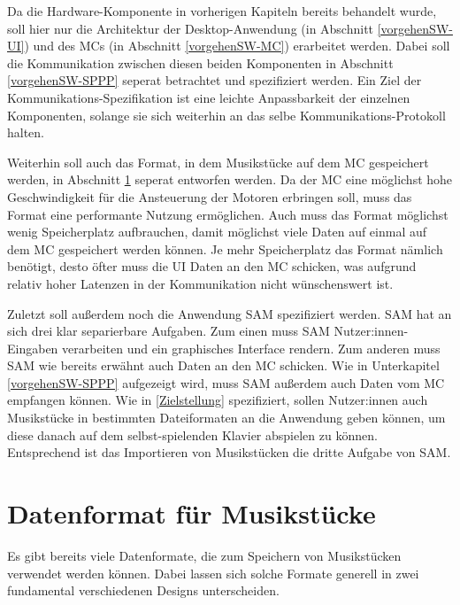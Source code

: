 Da die Hardware-Komponente in vorherigen Kapiteln bereits behandelt wurde, soll hier nur die Architektur der Desktop-Anwendung (in Abschnitt \ref{vorgehenSW-UI}) und des \ac{MC}s (in Abschnitt \ref{vorgehenSW-MC}) erarbeitet werden.
Dabei soll die Kommunikation zwischen diesen beiden Komponenten in Abschnitt \ref{vorgehenSW-SPPP} seperat betrachtet und spezifiziert werden.
Ein Ziel der Kommunikations-Spezifikation ist eine leichte Anpassbarkeit der einzelnen Komponenten, solange sie sich weiterhin an das selbe Kommunikations-Protokoll halten.

Weiterhin soll auch das Format, in dem Musikstücke auf dem \ac{MC} gespeichert werden, in Abschnitt \ref{vorgehenSW-PIDI} seperat entworfen werden.
Da der \ac{MC} eine möglichst hohe Geschwindigkeit für die Ansteuerung der Motoren erbringen soll, muss das Format eine performante Nutzung ermöglichen.
Auch muss das Format möglichst wenig Speicherplatz aufbrauchen, damit möglichst viele Daten auf einmal auf dem \ac{MC} gespeichert werden können.
Je mehr Speicherplatz das Format nämlich benötigt, desto öfter muss die \ac{UI} Daten an den \ac{MC} schicken, was aufgrund relativ hoher Latenzen in der Kommunikation nicht wünschenswert ist.

Zuletzt soll außerdem noch die Anwendung \ac{SAM} spezifiziert werden.
\ac{SAM} hat an sich drei klar separierbare Aufgaben.
Zum einen muss \ac{SAM} Nutzer:innen-Eingaben verarbeiten und ein graphisches Interface rendern.
Zum anderen muss \ac{SAM} wie bereits erwähnt auch Daten an den \ac{MC} schicken.
Wie in Unterkapitel \ref{vorgehenSW-SPPP} aufgezeigt wird, muss \ac{SAM} außerdem auch Daten vom \ac{MC} empfangen können.
Wie in \ref{Zielstellung} spezifiziert, sollen Nutzer:innen auch Musikstücke in bestimmten Dateiformaten an die Anwendung geben können, um diese danach auf dem selbst-spielenden Klavier abspielen zu können.
Entsprechend ist das Importieren von Musikstücken die dritte Aufgabe von \ac{SAM}.


\section{Datenformat für Musikstücke} \label{vorgehenSW-PIDI}

Es gibt bereits viele Datenformate, die zum Speichern von Musikstücken verwendet werden können. Dabei lassen sich solche Formate generell in zwei fundamental verschiedenen Designs unterscheiden.


